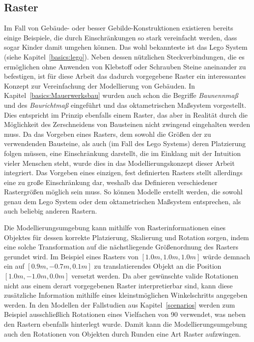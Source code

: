 \subsection{Raster}\label{concept:raster}
Im Fall von Gebäude- oder besser Gebilde-Konstruktionen existieren bereits einige Beispiele, die durch Einschränkungen so stark vereinfacht werden, dass sogar Kinder damit umgehen können.
Das wohl bekannteste ist das Lego System (siehe Kapitel~\ref{basics:lego}).
Neben dessen nützlichen Steckverbindungen, die es ermöglichen ohne Anwenden von Klebstoff oder Schrauben Steine aneinander zu befestigen, ist für diese Arbeit das dadurch vorgegebene Raster ein interessantes Konzept zur Vereinfachung der Modellierung von Gebäuden.
In Kapitel~\ref{basics:Mauerwerksbau} wurden auch schon die Begriffe \textit{Baunennmaß} und des \textit{Baurichtmaß} eingeführt und das oktametrischen Maßsystem vorgestellt.
Dies entspricht im Prinzip ebenfalls einem Raster, das aber in Realität durch die Möglichkeit des Zerschneidens von Bausteinen nicht zwingend eingehalten werden muss.
Da das Vorgeben eines Rasters, dem sowohl die Größen der zu verwendenden Bausteine, als auch (im Fall des Lego Systems) deren Platzierung folgen müssen, eine Einschränkung darstellt, die im Einklang mit der Intuition vieler Menschen steht, wurde dies in das Modellierungskonzept dieser Arbeit integriert.
Das Vorgeben eines einzigen, fest definierten Rasters stellt allerdings eine zu große Einschränkung dar, weshalb das Definieren verschiedener Rastergrößen möglich sein muss.
So können Modelle erstellt werden, die sowohl genau dem Lego System oder dem oktametrischen Maßsystem entsprechen, als auch beliebig anderen Rastern.

Die Modellierungsumgebung kann mithilfe von Rasterinformationen eines Objektes für dessen korrekte Platzierung, Skalierung und Rotation sorgen, indem eine solche Transformation auf die nächstliegende Größenordnung des Rasters gerundet wird.
Im Beispiel eines Rasters von \([1.0m, 1.0m, 1.0m]\) würde demnach ein auf \([0.9m, -0.7m, 0.1m]\) zu translatierendes Objekt an die Position \([1.0m, -1.0m, 0.0m]\) versetzt werden.
Da aber gewünschte valide Rotationen nicht aus einem derart vorgegebenen Raster interpretierbar sind, kann diese zusätzliche Information mithilfe eines kleinstmöglichen Winkelschritts angegeben werden.
In den Modellen der Fallstudien aus Kapitel~\ref{scenarios} werden zum Beispiel ausschließlich Rotationen eines Vielfachen von 90\degree{} verwendet, was neben den Rastern ebenfalls hinterlegt wurde.
Damit kann die Modellierungsumgebung auch den Rotationen von Objekten durch Runden eine Art Raster aufzwingen.

